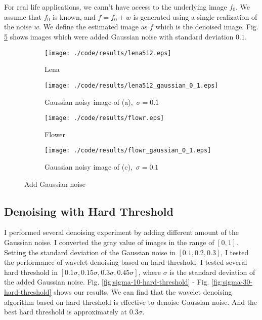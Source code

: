 \documentclass[journal,comsoc]{IEEEtran}
\begin{document}
For real life applications, we cann't have access to the underlying image $f_0$. We assume that $f_0$
is known, and $f=f_0+w$ is generated using a single realization of the noise $w$. We define the estimated image
as $\tilde{f}$ which is the denoised image. Fig. \ref{fig:add-gaussian-noise} shows images which were added
Gaussian noise with standard deviation $0.1$. 
\begin{figure}[!htb]
  \centering
  \begin{subfigure}[t]{.25\textwidth}
    \centering
    \texttt{[image: ./code/results/lena512.eps]}
    \caption{Lena}
    \label{subfig:lena}
  \end{subfigure}%
  \begin{subfigure}[t]{.25\textwidth}
    \centering
    \texttt{[image: ./code/results/lena512\_gaussian\_0\_1.eps]}
    \caption{Gaussian noisy image of (a),\ $\sigma=0.1$}
    \label{subfig:gaussian-noisy-image-of-a}
  \end{subfigure}
  \begin{subfigure}[t]{0.25\textwidth}
    \centering
    \texttt{[image: ./code/results/flowr.eps]}
    \caption{Flower}
    \label{subfig:flower}
  \end{subfigure}%
  \begin{subfigure}[t]{0.25\textwidth}
    \centering
    \texttt{[image: ./code/results/flowr\_gaussian\_0\_1.eps]}
    \caption{Gaussian noisy image of (c),\ $\sigma=0.1$}
    \label{subfig:gaussian-noisy-image-of-c}
  \end{subfigure}
  \caption{Add Gaussian noise}
  \label{fig:add-gaussian-noise}
\end{figure}

\subsection{Denoising with Hard Threshold}
\label{subsec:denoising-with-hard-thresholding}

I performed several denoising experiment by adding different amount of the Gaussian
noise. I converted the gray value of images in the range of $[0,1]$. Setting the
standard deviation of the Gaussian noise in $[0.1,0.2,0.3]$, I tested the performance of
wavelet denoising based on hard threshold. 
I tested several hard threshold in $[0.1\sigma,0.15\sigma,0.3\sigma,0.45\sigma]$,
where $\sigma$ is the standard deviation of the added Gaussian noise.
Fig. \ref{fig:sigma-10-hard-threshold} - Fig. \ref{fig:sigma-30-hard-threshold} shows our results.
We can find that the wavelet denoising algorithm based on hard threshold is effective to
denoise Gaussian noise. And the best hard threshold is approximately at $0.3\sigma$.
\end{document}
